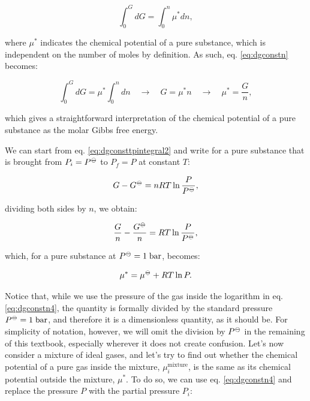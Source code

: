 \documentclass[
  9pt,
]{extbook}
\theoremstyle{definition}
\theoremstyle{definition}
\theoremstyle{definition}
\theoremstyle{remark}
\begin{document}
\begin{equation}
\int_0^G d G = \int_0^n \mu^* dn,
\label{eq:dgconstn}
\end{equation}

where \(\mu^*\) indicates the chemical potential of a pure substance, which is independent on the number of moles by definition. As such, eq. \eqref{eq:dgconstn} becomes:

\begin{equation}
\int_0^G d G = \mu^* \int_0^n dn \quad \rightarrow \quad G = \mu^* n \quad \rightarrow \quad \mu^* = \frac{G}{n},
\label{eq:dgconstn1}
\end{equation}

which gives a straightforward interpretation of the chemical potential of a pure substance as the molar Gibbs free energy.

We can start from eq. \eqref{eq:dgconsttpintegral2} and write for a pure substance that is brought from \(P_i=P^{-\kern-6pt{\ominus}\kern-6pt-}\) to \(P_f=P\) at constant \(T\):

\begin{equation}
G - G^{-\kern-6pt{\ominus}\kern-6pt-}= nRT \ln \frac{P}{P^{-\kern-6pt{\ominus}\kern-6pt-}},
\label{eq:dgconstn2}
\end{equation}

dividing both sides by \(n\), we obtain:

\begin{equation}
\frac{G}{n} - \frac{G^{-\kern-6pt{\ominus}\kern-6pt-}}{n} = RT \ln \frac{P}{P^{-\kern-6pt{\ominus}\kern-6pt-}},
\label{eq:dgconstn3}
\end{equation}

which, for a pure substance at \(P^{-\kern-6pt{\ominus}\kern-6pt-}= 1 \;\text{bar}\), becomes:

\begin{equation}
\mu^* = \mu^{-\kern-6pt{\ominus}\kern-6pt-}+ RT \ln P.
\label{eq:dgconstn4}
\end{equation}

Notice that, while we use the pressure of the gas inside the logarithm in eq. \eqref{eq:dgconstn4}, the quantity is formally divided by the standard pressure \(P^{-\kern-6pt{\ominus}\kern-6pt-}= 1 \;\text{bar}\), and therefore it is a dimensionless quantity, as it should be. For simplicity of notation, however, we will omit the division by \(P^{-\kern-6pt{\ominus}\kern-6pt-}\) in the remaining of this textbook, especially wherever it does not create confusion.
Let's now consider a mixture of ideal gases, and let's try to find out whether the chemical potential of a pure gas inside the mixture, \(\mu_i^{\text{mixture}}\), is the same as its chemical potential outside the mixture, \(\mu^*\).
To do so, we can use eq. \eqref{eq:dgconstn4} and replace the pressure \(P\) with the partial pressure \(P_i\):
\end{document}
